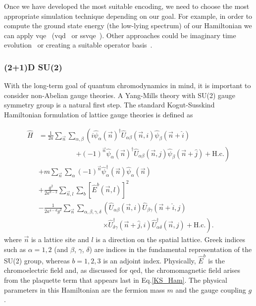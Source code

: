 Once we have developed the most suitable encoding, we need to choose the most appropriate simulation technique depending on our goal. For example, in order to compute the ground state energy (the low-lying spectrum) of our Hamiltonian we can apply \gls{vqe}~\cite{Peruzzo2014} (\gls{vqd}~\cite{Higgott2019} or \gls{ssvqe}~\cite{PhysRevResearch.1.033062}).
Other approaches could be imaginary time evolution~\cite{McArdle_2019} or creating a suitable operator basis~\cite{PhysRevResearch.2.043140}. 

\subsubsection{(2+1)D SU(2)}

With the long-term goal of quantum chromodynamics in mind, it is important to consider non-Abelian gauge theories. A Yang-Mills theory with SU(2) gauge symmetry group is a natural first step. The standard Kogut-Susskind Hamiltonian formulation of lattice gauge theories is defined as 

\begin{equation}
    \begin{aligned}
        \hat{H} &= \frac{1}{2a} \sum_{\vec{n}} \sum_{\alpha,\beta} \left(i \hat{\psi}_\alpha (\vec{n})^{\dag}\hat{U}_{\alpha\beta}(\vec{n},i)\hat{\psi}_\beta(\vec{n}+\hat{i})\right.\\
         &\phantom{ \frac{1}{2a} \sum_{\vec{n}} \sum_{\alpha,\beta}}\left.+ (-1)^{\vec{n}} \hat{\psi}_\alpha (\vec{n})^{\dag}\hat{U}_{\alpha\beta}(\vec{n},j)\hat{\psi}_\beta(\vec{n}+\hat{j})
        + \text{H.c.} \right) \\
        & + m\sum_{\vec{n}} \sum_{\alpha} (-1)^{\vec{n}} \hat{\psi}^{\dag}_{\alpha}(\vec{n})\hat{\psi}_{\alpha}(\vec{n})\\
        & + \frac{g^2}{2a^{d-2}} \sum_{\vec{n},l}\sum_{b} [\hat{E}^b(\vec{n},l)]^2 \\
        & -\frac{1}{2a^{4-d}g^2}\sum_{\vec{n}} \sum_{\alpha, \beta, \gamma, \delta}\left(\hat{U}_{\alpha \beta}(\vec{n},i)\hat{U}_{\beta \gamma}(\vec{n}+\hat{i},j)\right. \\
        & \phantom{-\frac{1}{2a^{4-d}g^2}\sum_{\vec{n}} \sum_{\alpha, \beta, \gamma, \delta}}\left.\times\hat{U}_{\delta \gamma}^{\dag}(\vec{n}+\hat{j},i)\hat{U}_{\alpha \delta}^{\dag}(\vec{n},j) + \text{H.c.}\right).
    \end{aligned}
    \label{KS_Ham}
\end{equation}
where $\vec n$ is a lattice site and $l$ is a direction on the spatial lattice. Greek indices such as $\alpha=1,2$ (and $\beta$, $\gamma$, $\delta$) are indices in the fundamental representation of the SU(2) group, whereas $b=1,2,3$ is an adjoint index. Physically, $\hat E^b$ is the chromoelectric field and, as discussed for \gls{qed}, the chromomagnetic field arises from the plaquette term that appears last in Eq.\eqref{KS_Ham}. The physical parameters in this Hamiltonian are the fermion mass $m$ and the gauge coupling $g$.

